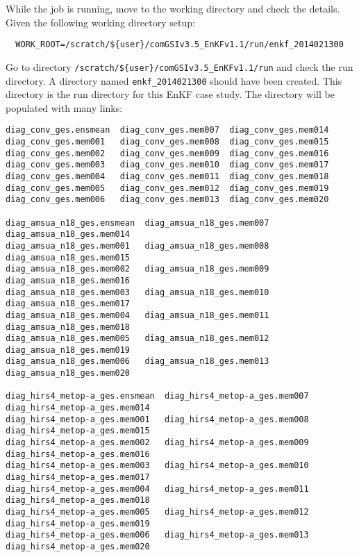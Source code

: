 While the job is running, move to the working directory and check the details. Given the following working directory setup:
\begin{small}
\begin{verbatim}
  WORK_ROOT=/scratch/${user}/comGSIv3.5_EnKFv1.1/run/enkf_2014021300
\end{verbatim}
\end{small}

Go to directory \verb|/scratch/${user}/comGSIv3.5_EnKFv1.1/run| and check the run directory. A directory named \verb|enkf_2014021300| should have been created. This directory is the run directory for this EnKF case study. The directory will be populated with many links:
\begin{footnotesize}
\begin{verbatim}
diag_conv_ges.ensmean  diag_conv_ges.mem007  diag_conv_ges.mem014
diag_conv_ges.mem001   diag_conv_ges.mem008  diag_conv_ges.mem015
diag_conv_ges.mem002   diag_conv_ges.mem009  diag_conv_ges.mem016
diag_conv_ges.mem003   diag_conv_ges.mem010  diag_conv_ges.mem017
diag_conv_ges.mem004   diag_conv_ges.mem011  diag_conv_ges.mem018
diag_conv_ges.mem005   diag_conv_ges.mem012  diag_conv_ges.mem019
diag_conv_ges.mem006   diag_conv_ges.mem013  diag_conv_ges.mem020

diag_amsua_n18_ges.ensmean  diag_amsua_n18_ges.mem007  diag_amsua_n18_ges.mem014
diag_amsua_n18_ges.mem001   diag_amsua_n18_ges.mem008  diag_amsua_n18_ges.mem015
diag_amsua_n18_ges.mem002   diag_amsua_n18_ges.mem009  diag_amsua_n18_ges.mem016
diag_amsua_n18_ges.mem003   diag_amsua_n18_ges.mem010  diag_amsua_n18_ges.mem017
diag_amsua_n18_ges.mem004   diag_amsua_n18_ges.mem011  diag_amsua_n18_ges.mem018
diag_amsua_n18_ges.mem005   diag_amsua_n18_ges.mem012  diag_amsua_n18_ges.mem019
diag_amsua_n18_ges.mem006   diag_amsua_n18_ges.mem013  diag_amsua_n18_ges.mem020

diag_hirs4_metop-a_ges.ensmean  diag_hirs4_metop-a_ges.mem007  diag_hirs4_metop-a_ges.mem014
diag_hirs4_metop-a_ges.mem001   diag_hirs4_metop-a_ges.mem008  diag_hirs4_metop-a_ges.mem015
diag_hirs4_metop-a_ges.mem002   diag_hirs4_metop-a_ges.mem009  diag_hirs4_metop-a_ges.mem016
diag_hirs4_metop-a_ges.mem003   diag_hirs4_metop-a_ges.mem010  diag_hirs4_metop-a_ges.mem017
diag_hirs4_metop-a_ges.mem004   diag_hirs4_metop-a_ges.mem011  diag_hirs4_metop-a_ges.mem018
diag_hirs4_metop-a_ges.mem005   diag_hirs4_metop-a_ges.mem012  diag_hirs4_metop-a_ges.mem019
diag_hirs4_metop-a_ges.mem006   diag_hirs4_metop-a_ges.mem013  diag_hirs4_metop-a_ges.mem020
\end{verbatim}
\end{footnotesize}

